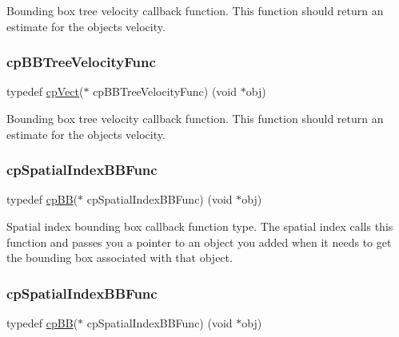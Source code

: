 Bounding box tree velocity callback function. This function should return an estimate for the object\textquotesingle{}s velocity. \mbox{\label{group__cpSpatialIndex_ga5e805ddbe3cab9b92a6fbd933ff6e6b0}} 
\subsubsection{\texorpdfstring{cp\+B\+B\+Tree\+Velocity\+Func}{cpBBTreeVelocityFunc}\hspace{0.1cm}{\footnotesize\ttfamily [2/2]}}
{\footnotesize\ttfamily typedef \hyperlink{structcpVect}{cp\+Vect}($\ast$ cp\+B\+B\+Tree\+Velocity\+Func) (void $\ast$obj)}

Bounding box tree velocity callback function. This function should return an estimate for the object\textquotesingle{}s velocity. \mbox{\label{group__cpSpatialIndex_gaa8cf991cadcee1fbb6ee9379a0a6e0ea}} 
\subsubsection{\texorpdfstring{cp\+Spatial\+Index\+B\+B\+Func}{cpSpatialIndexBBFunc}\hspace{0.1cm}{\footnotesize\ttfamily [1/2]}}
{\footnotesize\ttfamily typedef \hyperlink{structcpBB}{cp\+BB}($\ast$ cp\+Spatial\+Index\+B\+B\+Func) (void $\ast$obj)}

Spatial index bounding box callback function type. The spatial index calls this function and passes you a pointer to an object you added when it needs to get the bounding box associated with that object. \mbox{\label{group__cpSpatialIndex_gaa8cf991cadcee1fbb6ee9379a0a6e0ea}} 
\subsubsection{\texorpdfstring{cp\+Spatial\+Index\+B\+B\+Func}{cpSpatialIndexBBFunc}\hspace{0.1cm}{\footnotesize\ttfamily [2/2]}}
{\footnotesize\ttfamily typedef \hyperlink{structcpBB}{cp\+BB}($\ast$ cp\+Spatial\+Index\+B\+B\+Func) (void $\ast$obj)}

